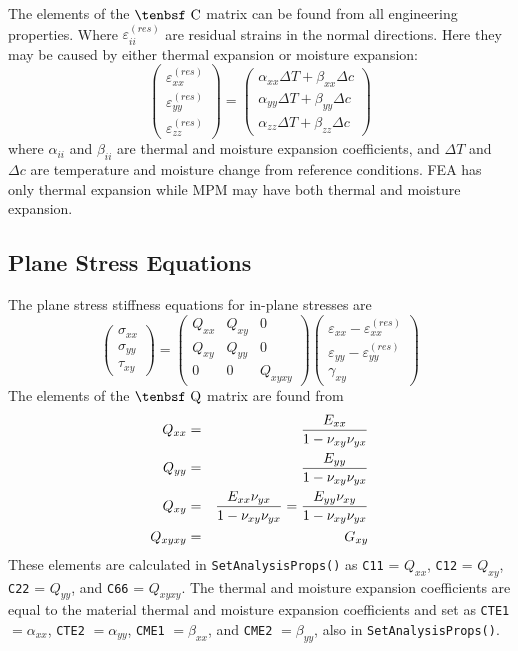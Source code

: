\documentclass[11pt]{article}
\def\a#1{\alpha_{#1}}
\def\b#1{\beta_{#1}}
\def\C{\hbox{\tenbsf C}}
\def\code#1{{\small\tt #1}}
\def\DT{\Delta T}
\def\e#1{\varepsilon_{#1}}
\def\er#1{\varepsilon_{#1}^{(res)}}
\def\g#1{\gamma_{#1}}
\def\Q{\hbox{\tenbsf Q}}
\def\s#1{\sigma_{#1}}
\def\symmat#1#2#3#4#5#6{\left(\begin{array}{ccc} #1 & #2 & #3 \\ #2 & #4 & #5 \\
                                                      #3 & #5 & #6 \end{array}\right)}
\def\t#1{\tau_{#1}}
\def\v#1{\nu_{#1}}
\def\vvec#1#2#3{\left(\begin{array}{ccc} #1 \\ #2 \\ #3 \end{array}\right)}
\begin{document}
The elements of the $\C$ matrix can be found from all engineering properties. Where $\er{ii}$ are  residual strains in the normal directions. Here they may be caused by either thermal expansion or moisture expansion:
\begin{equation}
\left(\begin{array}{c} \er{xx} \\ \er{yy} \\ \er{zz} \end{array}\right)
       =  \left(\begin{array}{c}
	\a{xx}\DT + \b{xx}\Delta c \\
	\a{yy}\DT + \b{yy}\Delta c \\
	\a{zz}\DT + \b{zz}\Delta c  \end{array}\right)
\end{equation}
where $\a{ii}$ and $\b{ii}$ are thermal and moisture expansion coefficients, and $\DT$ and $\Delta c$ are temperature and moisture change from reference conditions. FEA has only thermal expansion while MPM may have both thermal and moisture expansion.

\subsection{Plane Stress Equations}

The plane stress stiffness equations for in-plane stresses are
\begin{equation}
      \vvec{\s{xx}}{\s{yy}}{\t{xy}} = \symmat{Q_{xx}}{Q_{xy}}{0}{Q_{yy}}{0}{Q_{xyxy}}
          \vvec{\e{xx} - \er{xx}}{\e{yy} - \er{yy}}{\g{xy}}
 \end{equation}
The elements of the $\Q$ matrix are found from
\begin{eqnarray}%
   Q_{xx} &  = &  {E_{xx}\over 1 - \v{xy}\v{yx}} \\
   Q_{yy} & = & {E_{yy}\over 1 - \v{xy}\v{yx}} \\
   Q_{xy} &  = & {E_{xx}\v{yx}\over 1 - \v{xy}\v{yx}}  =  {E_{yy}\v{xy}\over 1 - \v{xy}\v{yx}}\\
   Q_{xyxy} & = &  G_{xy} 
\end{eqnarray}%
These elements are calculated in \code{SetAnalysisProps()} as \code{C11} = $Q_{xx}$, \code{C12} = $Q_{xy}$, \code{C22} = $Q_{yy}$, and \code{C66} = $Q_{xyxy}$. The thermal  and moisture expansion coefficients are equal to the material thermal  and moisture expansion coefficients and set as \code{CTE1} $=\a{xx}$, \code{CTE2} $=\a{yy}$, \code{CME1} $=\b{xx}$, and \code{CME2} $=\b{yy}$, also in \code{SetAnalysisProps()}.
\end{document}
